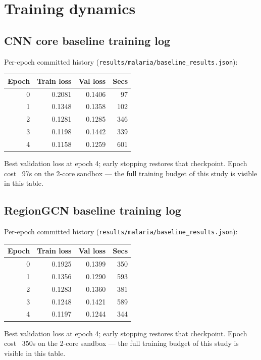 
\section{Training dynamics}

\subsection{CNN core baseline training log}
Per-epoch committed history (\texttt{results/malaria/baseline\_results.json}):
\begin{tabular}{rrrr}
\hline Epoch & Train loss & Val loss & Secs \\ \hline
0 & 0.2081 & 0.1406 & 97 \\
1 & 0.1348 & 0.1358 & 102 \\
2 & 0.1281 & 0.1285 & 346 \\
3 & 0.1198 & 0.1442 & 339 \\
4 & 0.1158 & 0.1259 & 601 \\
\hline
\end{tabular}
Best validation loss at epoch 4; early stopping restores that
checkpoint. Epoch cost ~97s on the 2-core sandbox ---
the full training budget of this study is visible in this table.


\subsection{RegionGCN baseline training log}
Per-epoch committed history (\texttt{results/malaria/baseline\_results.json}):
\begin{tabular}{rrrr}
\hline Epoch & Train loss & Val loss & Secs \\ \hline
0 & 0.1925 & 0.1399 & 350 \\
1 & 0.1356 & 0.1290 & 593 \\
2 & 0.1283 & 0.1360 & 381 \\
3 & 0.1248 & 0.1421 & 589 \\
4 & 0.1197 & 0.1244 & 344 \\
\hline
\end{tabular}
Best validation loss at epoch 4; early stopping restores that
checkpoint. Epoch cost ~350s on the 2-core sandbox ---
the full training budget of this study is visible in this table.
